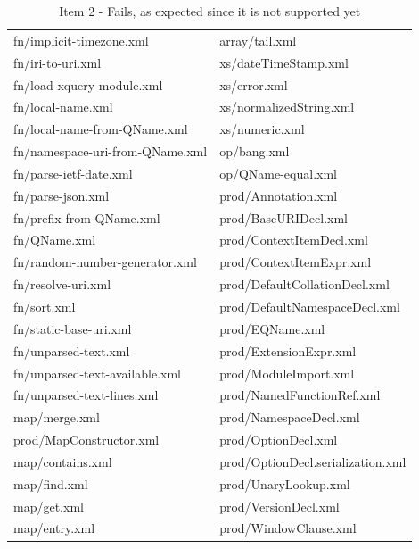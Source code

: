 \begin{table}[]
\begin{tabular}{ll}
		fn/implicit-timezone.xml                  & array/tail.xml                             \\
		fn/iri-to-uri.xml                         & xs/dateTimeStamp.xml                       \\
		fn/load-xquery-module.xml                 & xs/error.xml                               \\
		fn/local-name.xml                         & xs/normalizedString.xml                    \\
		fn/local-name-from-QName.xml              & xs/numeric.xml                             \\
		fn/namespace-uri-from-QName.xml           & op/bang.xml                                \\
		fn/parse-ietf-date.xml                    & op/QName-equal.xml                         \\
		fn/parse-json.xml                         & prod/Annotation.xml                        \\
		fn/prefix-from-QName.xml                  & prod/BaseURIDecl.xml                       \\
		fn/QName.xml                              & prod/ContextItemDecl.xml                   \\
		fn/random-number-generator.xml            & prod/ContextItemExpr.xml                   \\
		fn/resolve-uri.xml                        & prod/DefaultCollationDecl.xml              \\
		fn/sort.xml                               & prod/DefaultNamespaceDecl.xml              \\
		fn/static-base-uri.xml                    & prod/EQName.xml                            \\
		fn/unparsed-text.xml                      & prod/ExtensionExpr.xml                     \\
		fn/unparsed-text-available.xml            & prod/ModuleImport.xml                      \\
		fn/unparsed-text-lines.xml                & prod/NamedFunctionRef.xml                  \\
		map/merge.xml                             & prod/NamespaceDecl.xml                     \\
		prod/MapConstructor.xml                   & prod/OptionDecl.xml                        \\
		map/contains.xml                          & prod/OptionDecl.serialization.xml          \\
		map/find.xml                              & prod/UnaryLookup.xml                       \\
		map/get.xml                               & prod/VersionDecl.xml                       \\
		map/entry.xml                             & prod/WindowClause.xml                     
	\end{tabular}
	\caption{Item 2 - Fails, as expected since it is not supported yet}
	\label{tab:Phase3_Item2}
\end{table}